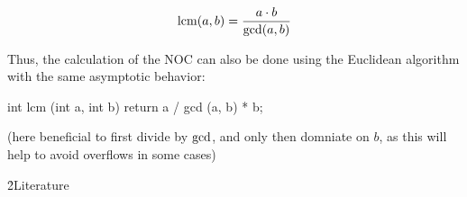$$ {\rm lcm}(a,b) = \frac{ a \cdot b }{ {\rm gcd}(a,b) } $$

Thus, the calculation of the NOC can also be done using the Euclidean algorithm with the same asymptotic behavior:

\code
int lcm (int a, int b) {
return a / gcd (a, b) * b;
}
\endcode

(here beneficial to first divide by $\rm gcd$, and only then domniate on $b$, as this will help to avoid overflows in some cases)


\h2{Literature}

\ul{
\li {}
}